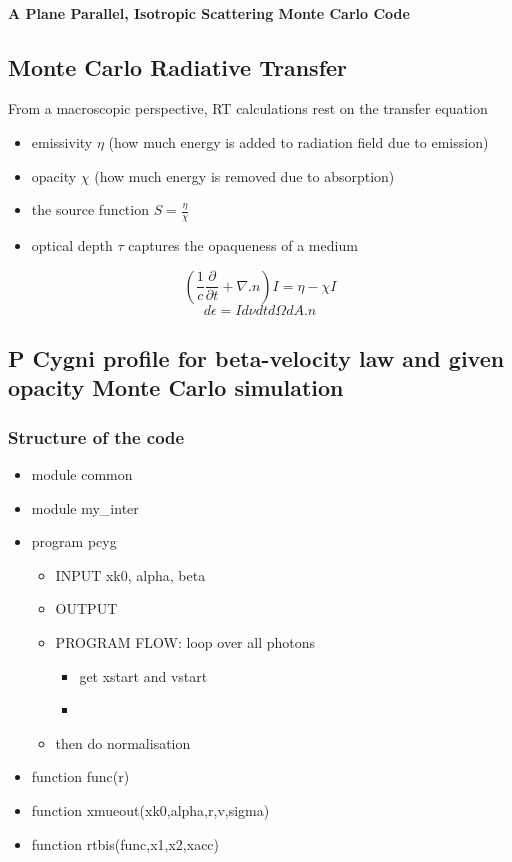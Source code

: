 \documentclass[10pt,a4paper]{article}
\begin{document}
\paragraph{A Plane Parallel, Isotropic Scattering Monte Carlo Code}

\newpage
\subsection{Monte Carlo Radiative Transfer}
From a macroscopic perspective, RT calculations rest on the transfer equation
\begin{itemize}
\item emissivity $\eta$ (how much energy is added to radiation field due to emission)
\item opacity $\chi$ (how much energy is removed due to absorption)
\item the source function $S = \frac{\eta}{\chi}$
\item optical depth $\tau$ captures the opaqueness of a medium
\end{itemize}
\begin{equation}
\left( \frac{1}{c} \frac{\partial}{\partial t} + \nabla.n \right)I = \eta - \chi I
\end{equation}
\begin{equation}
d\epsilon = I d \nu dt d\Omega dA.n
\end{equation}

\newpage
\subsection{P Cygni profile for beta-velocity law and given opacity Monte Carlo simulation}
\subsubsection{Structure of the code}
\begin{itemize}
\item module common

\item module my\_inter

\item program pcyg
\begin{itemize}
\item INPUT xk0, alpha, beta
\item OUTPUT 
\item PROGRAM FLOW: loop over all photons
\begin{itemize}
\item get xstart and vstart
\item 
\end{itemize}
\item then do normalisation
\end{itemize}

\item function func(r)

\item function xmueout(xk0,alpha,r,v,sigma)

\item function rtbis(func,x1,x2,xacc)
\end{itemize}
\end{document}
